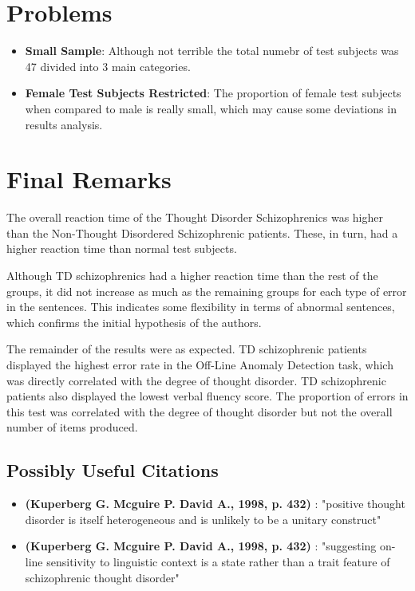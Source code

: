 \documentclass{Paper_Summary}
\begin{document}
\section{Problems}
    \begin{itemize}
        \item \textbf{Small Sample}: Although not terrible the total numebr of test subjects was 47 divided into 3 main categories.
        \item \textbf{Female Test Subjects Restricted}: The proportion of female test subjects when compared to male is really small, which may cause some deviations in results analysis.
    \end{itemize}


\section{Final Remarks}

    The overall reaction time of the Thought Disorder Schizophrenics was higher than the Non-Thought Disordered Schizophrenic patients. These, in turn, had a higher reaction time than normal test subjects.

    Although TD schizophrenics had a higher reaction time than the rest of the groups, it did not increase as much as the remaining groups for each type of error in the sentences. This indicates some flexibility in terms of abnormal sentences, which confirms the initial hypothesis of the authors.

    The remainder of the results were as expected. TD schizophrenic patients displayed the highest error rate in the Off-Line Anomaly Detection task, which was directly correlated with the degree of thought disorder.
    TD schizophrenic patients also displayed the lowest verbal fluency score. The proportion of errors in this test was correlated with the degree of thought disorder but not the overall number of items produced.

\breakline

\begin{center}
    \section*{Possibly Useful Citations}
\end{center}

    \begin{itemize}
        \item \textbf{(Kuperberg G. Mcguire P. David A., 1998, p. 432)} : "positive thought disorder is itself heterogeneous and is unlikely to be a unitary construct"
        \item \textbf{(Kuperberg G. Mcguire P. David A., 1998, p. 432)} : "suggesting on-line sensitivity to linguistic context is a state rather than a trait feature of schizophrenic thought disorder"
    \end{itemize}
\end{document}
